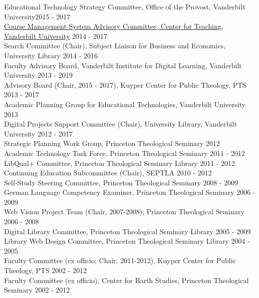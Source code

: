 \documentclass[]{res} %
\begin{document}
\begin{resume}
Educational Technology Strategy Committee, Office of the Provost, Vanderbilt University\hfill 2015 - 2017 \\
\href{https://www.vanderbilt.edu/blackboard/about/advisory-committee/}{Course Management System Advisory Committee, Center for Teaching, Vanderbilt University} \hfill 2014 - 2017 \\
Search Committee (Chair), Subject Liaison for Business and Economics, University Library \hfill 2014 - 2016 \\
Faculty Advisory Board, Vanderbilt Institute for Digital Learning, Vanderbilt University \hfill 2013 - 2019 \\
Advisory Board (Chair, 2015 - 2017), Kuyper Center for Public Theology, PTS \hfill 2013 - 2017 \\
Academic Planning Group for Educational Technologies, Vanderbilt University \hfill 2013 \\
Digital Projects Support Committee (Chair), University Library, Vanderbilt University \hfill 2012 - 2017 \\
Strategic Planning Work Group, Princeton Theological Seminary \hfill 2012 \\
Academic Technology Task Force, Princeton Theological Seminary \hfill 2011 - 2012 \\
LibQual+ Committee, Princeton Theological Seminary Library \hfill 2011 - 2012 \\
Continuing Education Subcommittee (Chair), SEPTLA \hfill 2010 - 2012 \\
Self-Study Steering Committee, Princeton Theological Seminary  \hfill 2008 - 2009 \\
German Language Competency Examiner, Princeton Theological Seminary \hfill 2006 - 2009 \\
Web Vision Project Team (Chair, 2007-2008), Princeton Theological Seminary \hfill 2006 - 2008 \\
Digital Library Committee, Princeton Theological Seminary Library \hfill 2005 - 2009 \\
Library Web Design Committee, Princeton Theological Seminary Library \hfill 2004 - 2005 \\
Faculty Committee (ex officio; Chair, 2011-2012), Kuyper Center for Public Theology, PTS \hfill 2002 - 2012 \\
Faculty Committee (ex officio), Center for Barth Studies, Princeton Theological Seminary  \hfill 2002 - 2012



\end{resume}
\end{document}
